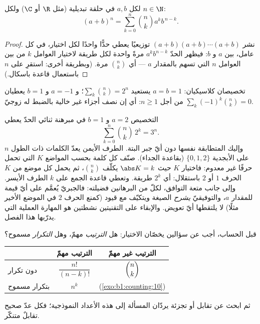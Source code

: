 \begin{theorem}\label{thm:b1:counting:binomial}
لكل $a, b$ في حلقة تبديلية (مثل $\R$ أو $\C$) ولكل $n \in \N$:
\[
(a + b)^n = \sum_{k=0}^{n} \binom{n}{k} a^k b^{\,n-k} .
\]
\end{theorem}

\begin{proof}
نشر $(a+b)(a+b)\cdots(a+b)$ توزيعيًا يعطي حدًّا واحدًا لكل اختيار، في كل عامل، بين $a$ و $b$: فيظهر الحدّ $a^k b^{n-k}$
مرةً واحدة لكل طريقة لاختيار العوامل $k$ من بين العوامل $n$ التي تسهم بالمقدار $a$ --- أي $\binom nk$ مرة. (وبطريقة أخرى: استقرِ
على $n$ باستعمال قاعدة باسكال.)
\end{proof}

\begin{example}\label{ex:b1:counting:binomial}
تخصيصان كلاسيكيان: $a = b = 1$ يستعيد $\sum_k \binom nk
= 2^n$؛ و $a = -1$ و $b = 1$ يعطيان $\sum_{k} (-1)^k \binom nk = 0$ من أجل
$n \geq 1$: أي إن نصف أجزاء  غير خالية بالضبط له  زوجيّ.
\end{example}

\begin{example}\label{ex:b1:counting:threen}
التخصيص $a = 2$ و $b = 1$ في مبرهنة ثنائي الحدّ يعطي
\[
\sum_{k=0}^{n} \binom nk\,2^k = 3^n .
\]
وإليك المتطابقة نفسها دون أيّ جبر البتة. الطرف الأيمن يعدّ
الكلمات ذات الطول $n$ على الأبجدية $\{0, 1, 2\}$
(بقاعدة الجداء). صنّف كل كلمة بحسب  المواضع $K$ التي
تحمل حرفًا غير معدوم: فاختيار $K$ حيث $\abs K = k$ يكلّف
$\binom nk$، ثم يحمل كل موضع من $K$ الحرف $1$ أو $2$ باستقلال:
أي $2^k$ طريقة. وتعطي قاعدة الجمع على $k$ الطرف الأيسر.
وإلى جانب متعة التوافق، لكلّ من البرهانين فضيلته: فالجبريّ
يُعمَّم على أيّ قيمة للمقدار $a$، والتوفيقيّ \emph{يشرح} الصيغة
ويتكيّف مع قيود (كمنع الحرف $2$ في الموضع الأخير مثلًا) لا
يلتقطها أيّ تعويض. والإبقاء على التقنيتين نشطتين هو المهارة
العملية التي يدرّبها هذا الفصل.
\end{example}

\begin{method}[أيّ عدّ ينطبق؟]\label{met:b1:counting:which}
قبل الحساب، أجب عن سؤالين يخصّان الاختيار: هل \emph{الترتيب}
مهمّ، وهل \emph{التكرار} مسموح؟
\begin{center}
\renewcommand{\arraystretch}{1.4}
\begin{tabular}{l|c|c}
 & الترتيب مهمّ & الترتيب غير مهمّ \\
\hline
دون تكرار & $\dfrac{n!}{(n-k)!}$ & $\dbinom{n}{k}$ \\[6pt]
بتكرار مسموح & $n^k$ & (\cref{exo:b1:counting:10}) \\
\end{tabular}
\end{center}
ثم ابحث عن تقابل أو تجزئة يردّان المسألة إلى هذه الأعداد
النموذجية؛ فكل عدّ صحيح تقابلٌ متنكّر.
\end{method}

